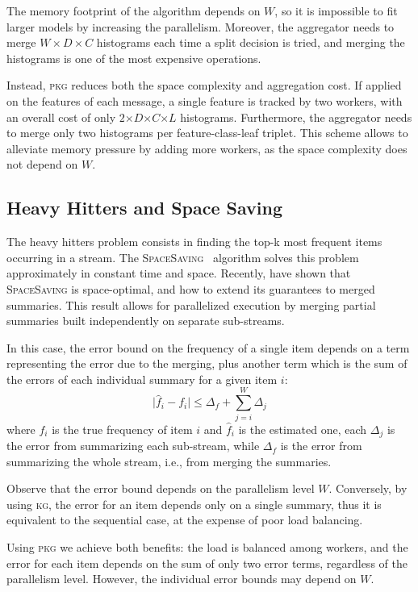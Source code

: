 \documentclass[10pt,conference,letterpaper]{IEEEtran}
\newcommand{\pkgs}{\textsc{pkg}\xspace}
\newcommand{\kg}{\textsc{kg}\xspace}
\begin{document}
The memory footprint of the algorithm depends on $W$, so it is impossible to fit larger models by increasing the parallelism.
Moreover, the aggregator needs to merge $W \times D \times C$ histograms each time a split decision is tried, and merging the histograms is one of the most expensive operations.

Instead, \pkgs reduces both the space complexity and aggregation cost.
If applied on the features of each message, a single feature is tracked by two workers, with an overall cost of only $2$$\times$$D$$\times$$C$$\times$$L$ histograms.
Furthermore, the aggregator needs to merge only two histograms per feature-class-leaf triplet.
This scheme allows to alleviate memory pressure by adding more workers, as the space complexity does not depend on $W$.





\subsection{Heavy Hitters and Space Saving}

The heavy hitters problem consists in finding the top-k most frequent items occurring in a stream.
The \textsc{SpaceSaving}~\citep{metwally2005spacesaving} algorithm solves this problem approximately in constant time and space.
Recently, \citet{berinde2010heavyhitters} have shown that \textsc{SpaceSaving} is space-optimal, and how to extend its guarantees to merged summaries.
This result allows for parallelized execution by merging partial summaries built independently on separate sub-streams.

In this case, the error bound on the frequency of a single item depends on a term representing the error due to the merging, plus another term which is the sum of the errors of each individual summary for a given item $i$:
$$
\mid \hat{f}_i - f_i \mid \leq \Delta_{f} + \sum_{j=i}^{W}\Delta_{j}
$$
where $f_i$ is the true frequency of item $i$ and $\hat{f}_i$ is the estimated one, each $\Delta_j$ is the error from summarizing each sub-stream, while $\Delta_{f}$ is the error from summarizing the whole stream, i.e., from merging the summaries.

Observe that the error bound depends on the parallelism level $W$.
Conversely, by using \kg, the error for an item depends only on a single summary, thus it is equivalent to the sequential case, at the expense of poor load balancing.


Using \pkgs we achieve both benefits: the load is balanced among workers, and the error for each item depends on the sum of only two error
terms, regardless of the parallelism level.
However, the individual error bounds may depend on $W$.
\end{document}

